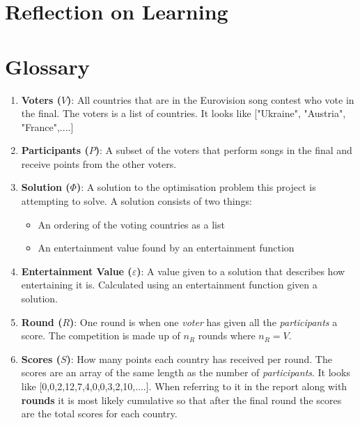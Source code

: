 \documentclass[12pt]{report}
\begin{document}
\section{Reflection on Learning}\label{Reflection}

\section*{Glossary}
\begin{enumerate}
\item \textbf{Voters ($V$)}: All countries that are in the Eurovision song contest who vote in the final. The voters is a list of countries. It looks like ["Ukraine", "Austria", "France",....]
\item \textbf{Participants ($P$)}: A subset of the voters that perform songs in the final and receive points from the other voters.
\item \textbf{Solution ($\Phi$)}: A solution to the optimisation problem this project is attempting to solve. A solution consists of two things:
	\begin{itemize}
		\item An ordering of the voting countries as a list
		\item An entertainment value found by an entertainment function
	\end{itemize}
\item \textbf{Entertainment Value ($\varepsilon$)}: A value given to a solution that describes how entertaining it is. Calculated using an entertainment function given a solution.
\item \textbf{Round ($R$)}: One round is when one \textit{voter} has given all the \textit{participants} a score. The competition is made up of $n_R$ rounds where $n_R = V$.
\item \textbf{Scores ($S$)}: How many points each country has received per round. The scores are an array of the same length as the number of \textit{participants}. It looks like [0,0,2,12,7,4,0,0,3,2,10,....]. When referring to it in the report along with \textbf{rounds} it is most likely cumulative so that after the final round the scores are the total scores for each country.
\end{enumerate}
\end{document}
